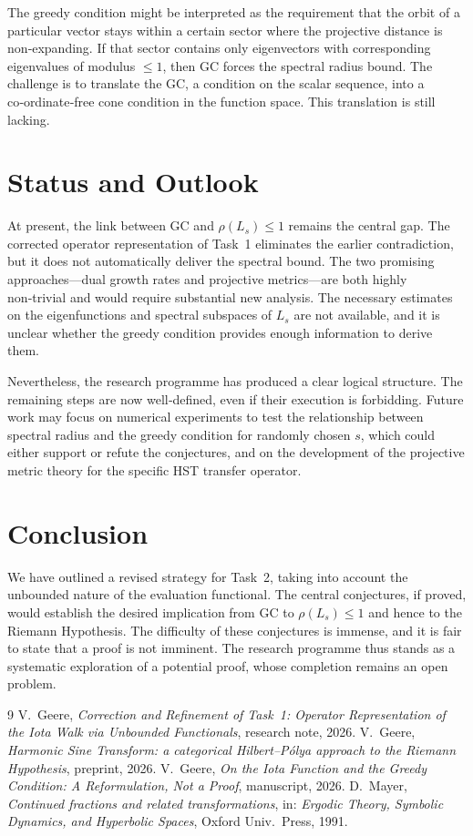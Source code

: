 \documentclass[11pt,a4paper]{article}
\begin{document}
The greedy condition might be interpreted as the requirement that the orbit of a particular vector stays within a certain sector where the projective distance is non‑expanding.  If that sector contains only eigenvectors with corresponding eigenvalues of modulus \(\le 1\), then GC forces the spectral radius bound.  The challenge is to translate the GC, a condition on the scalar sequence, into a co‑ordinate‑free cone condition in the function space.  This translation is still lacking.

\section{Status and Outlook}
At present, the link between GC and \(\rho(L_s) \le 1\) remains the central gap.  The corrected operator representation of Task~1 eliminates the earlier contradiction, but it does not automatically deliver the spectral bound.  The two promising approaches—dual growth rates and projective metrics—are both highly non‑trivial and would require substantial new analysis.  The necessary estimates on the eigenfunctions and spectral subspaces of \(L_s\) are not available, and it is unclear whether the greedy condition provides enough information to derive them.

Nevertheless, the research programme has produced a clear logical structure.  The remaining steps are now well‑defined, even if their execution is forbidding.  Future work may focus on numerical experiments to test the relationship between spectral radius and the greedy condition for randomly chosen \(s\), which could either support or refute the conjectures, and on the development of the projective metric theory for the specific HST transfer operator.

\section{Conclusion}
We have outlined a revised strategy for Task~2, taking into account the unbounded nature of the evaluation functional.  The central conjectures, if proved, would establish the desired implication from GC to \(\rho(L_s) \le 1\) and hence to the Riemann Hypothesis.  The difficulty of these conjectures is immense, and it is fair to state that a proof is not imminent.  The research programme thus stands as a systematic exploration of a potential proof, whose completion remains an open problem.

\begin{thebibliography}{9}
 V.\ Geere, \emph{Correction and Refinement of Task~1: Operator Representation of the Iota Walk via Unbounded Functionals}, research note, 2026.
 V.\ Geere, \emph{Harmonic Sine Transform: a categorical Hilbert--Pólya approach to the Riemann Hypothesis}, preprint, 2026.
 V.\ Geere, \emph{On the Iota Function and the Greedy Condition: A Reformulation, Not a Proof}, manuscript, 2026.
 D.\ Mayer, \emph{Continued fractions and related transformations}, in: \textit{Ergodic Theory, Symbolic Dynamics, and Hyperbolic Spaces}, Oxford Univ.\ Press, 1991.
\end{thebibliography}
\end{document}

